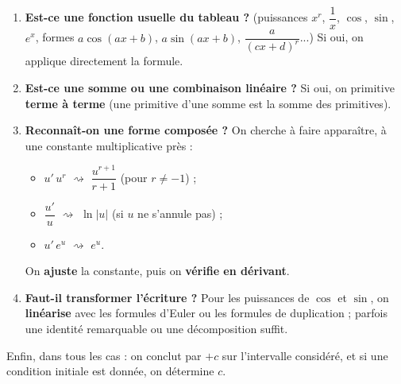 \documentclass[11pt]{article}
\begin{document}
\begin{methode}
\begin{enumerate}
\item \textbf{Est-ce une fonction usuelle du tableau ?} (puissances $x^r$, $\dfrac{1}{x}$, $\cos$, $\sin$, $e^x$, formes $a\cos(ax+b)$, $a\sin(ax+b)$, $\dfrac{a}{(cx+d)^r}$...) Si oui, on applique directement la formule.
\item \textbf{Est-ce une somme ou une combinaison linéaire ?} Si oui, on primitive \textbf{terme à terme} (une primitive d'une somme est la somme des primitives).
\item \textbf{Reconnaît-on une forme composée ?} On cherche à faire apparaître, à une constante multiplicative près :
\begin{itemize}
\item $u'\,u^{r}$ \quad $\rightsquigarrow$ \quad $\dfrac{u^{r+1}}{r+1}$ (pour $r \neq -1$) ;
\item $\dfrac{u'}{u}$ \quad $\rightsquigarrow$ \quad $\ln|u|$ (si $u$ ne s'annule pas) ;
\item $u'\,e^{u}$ \quad $\rightsquigarrow$ \quad $e^{u}$.
\end{itemize}
On \textbf{ajuste} la constante, puis on \textbf{vérifie en dérivant}.
\item \textbf{Faut-il transformer l'écriture ?} Pour les puissances de $\cos$ et $\sin$, on \textbf{linéarise} avec les formules d'Euler ou les formules de duplication ; parfois une identité remarquable ou une décomposition suffit.
\end{enumerate}
Enfin, dans tous les cas : on conclut par $+c$ sur l'intervalle considéré, et si une condition initiale est donnée, on détermine $c$.
\end{methode}
\end{document}
